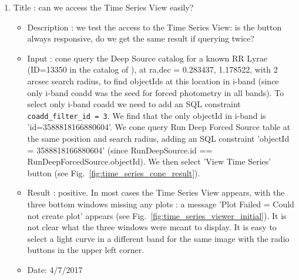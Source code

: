 \documentclass[DM,lsstdraft,toc]{lsstdoc}
\begin{document}
\begin{enumerate}
   \item Title : can we access the Time Series View easily?
    \begin{itemize}
      \item Description : we test the access to the Time Series View: is the button always responsive, do we get the same result if querying twice?
      \item Input : cone query the Deep Source catalog for a known RR Lyrae (ID=13350 in the catalog of \citep{2010ApJ...708..717S} ),  at ra,dec = 0.283437\degree, 1.178522\degree, with 2 arcsec search radius, to find objectIds at this location  in i-band (since only i-band coadd was the seed for forced photometry in all bands).  To select only i-band coadd we need to  add an SQL constraint \verb|coadd_filter_id = 3|.  We find that the only objectId in i-band is 'id=3588818166880604'.  We  cone query Run Deep Forced Source table at the same position and search radius, adding an SQL constraint  'objectId = 3588818166880604' (since RunDeepSource.id == RunDeepForcedSource.objectId). We then select 'View Time Series' button (see Fig.~\ref{fig:time_series_cone_result}).
      \item Result : positive. In most cases the Time Series View appears,  with the three bottom windows missing any plots : a message 'Plot Failed = Could not create plot' appears (see Fig.~\ref{fig:time_series_viewer_initial}).  It is not clear what the three windows were meant to display. It is easy to select a light curve in a different band for the same image with the radio buttons in the upper left corner.
      \item Date: 4/7/2017
    \end{itemize}


\end{enumerate}
\end{document}
